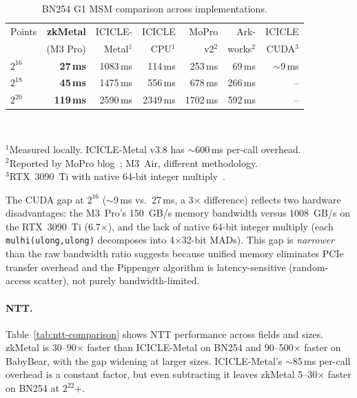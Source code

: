 \begin{table}[t]
\centering
\small
\caption{BN254 G1 MSM comparison across implementations.}
\label{tab:msm-comparison}
\begin{tabular}{lrrrrrr}
\toprule
Points & \textbf{zkMetal} & ICICLE- & ICICLE & MoPro & Ark- & ICICLE \\
       & (M3 Pro) & Metal$^1$ & CPU$^1$ & v2$^2$ & works$^2$ & CUDA$^3$ \\
\midrule
$2^{16}$ & \textbf{27\,ms} & 1083\,ms & 114\,ms & 253\,ms & 69\,ms & $\sim$9\,ms \\
$2^{18}$ & \textbf{45\,ms} & 1475\,ms & 556\,ms & 678\,ms & 266\,ms & -- \\
$2^{20}$ & \textbf{119\,ms} & 2590\,ms & 2349\,ms & 1702\,ms & 592\,ms & -- \\
\bottomrule
\end{tabular}
\\[2pt]
\raggedright\scriptsize
$^1$Measured locally. ICICLE-Metal v3.8 has $\sim$600\,ms per-call overhead.\\
$^2$Reported by MoPro blog~\cite{mopro}; M3~Air, different methodology.\\
$^3$RTX~3090~Ti with native 64-bit integer multiply~\cite{icicle}.
\end{table}

The CUDA gap at $2^{16}$ ($\sim$9\,ms vs.\ 27\,ms, a 3$\times$ difference) reflects two hardware disadvantages: the M3~Pro's 150~GB/s memory bandwidth versus 1008~GB/s on the RTX~3090~Ti (6.7$\times$), and the lack of native 64-bit integer multiply (each \texttt{mulhi(ulong,ulong)} decomposes into 4$\times$32-bit MADs).
This gap is \emph{narrower} than the raw bandwidth ratio suggests because unified memory eliminates PCIe transfer overhead and the Pippenger algorithm is latency-sensitive (random-access scatter), not purely bandwidth-limited.

\paragraph{NTT.}
Table~\ref{tab:ntt-comparison} shows NTT performance across fields and sizes.
zkMetal is 30--90$\times$ faster than ICICLE-Metal on BN254 and 90--500$\times$ faster on BabyBear, with the gap widening at larger sizes.
ICICLE-Metal's $\sim$85\,ms per-call overhead is a constant factor, but even subtracting it leaves zkMetal 5--30$\times$ faster on BN254 at $2^{22}$+.

